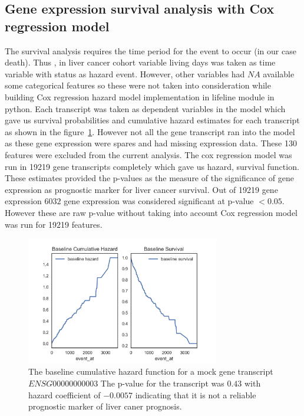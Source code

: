 \documentclass{article}
\begin{document}
	\subsection {Gene expression survival analysis with Cox regression model }
	
	The survival analysis requires the time period for the event to occur (in our case death). Thus , in liver cancer cohort variable living days was taken as time variable with status as hazard event. However, other variables had $NA$ available  some categorical features so these were not taken into consideration while building Cox regression hazard model implementation in lifeline module in python. Each transcript was taken as dependent variables in the model which gave us survival probabilities and cumulative hazard estimates for each transcript as shown in the figure~\ref{fig:Baseline_hazard_and_survival}. However not all the gene transcript ran into the model as these gene expression were spares and had missing expression data. These 130 features were excluded from the current analysis.  The cox regression model was run in 19219 gene transcripts completely which gave us hazard, survival function. These estimates provided the p-values as the measure of the significance of gene expression as prognostic marker for  liver cancer survival. Out of 19219 gene expression $6032$ gene expression was considered significant at p-value $< 0.05$. However these are raw p-value without taking into account Cox regression model was run for 19219 features.   
	
\begin{figure}[tbh]
    \centering
      \includegraphics[width=0.75\textwidth]{survial_plot_one_mock_gene.png}
    \caption{The baseline cumulative hazard function for a mock gene transcript $ENSG00000000003$   The p-value for the transcript was $0.43$ with hazard coefficient of $-0.0057$ indicating that it is not a reliable prognostic marker of liver caner prognosis.}
    \label{fig:Baseline_hazard_and_survival}
\end{figure}
  		
\end{document}
